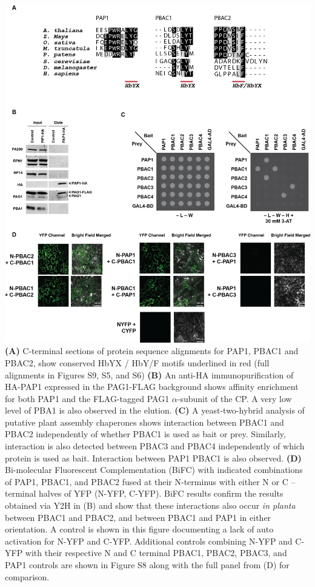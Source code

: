 \begin{FPfigure}
	\centering
	\includegraphics[width=\columnwidth]{Proteasome/papschar.png}
	{\textbf{(A)} C-terminal sections of protein sequence alignments for PAP1, PBAC1 and PBAC2, show conserved HbYX / HbY/F motifs underlined in red (full alignments in Figures S9, S5, and S6) \textbf{(B)} An anti-HA immunopurification of HA-PAP1 expressed in the PAG1-FLAG background shows affinity enrichment for both PAP1 and the FLAG-tagged PAG1 $\alpha$-subunit of the CP. A very low level of PBA1 is also observed in the elution. \textbf{(C)} A yeast-two-hybrid analysis of putative plant assembly chaperones shows interaction between PBAC1 and PBAC2 independently of whether PBAC1 is used as bait or prey. Similarly, interaction is also detected between PBAC3 and PBAC4 independently of which protein is used as bait. Interaction between PAP1 PBAC1 is also observed. \textbf{(D)} Bi-molecular Fluorescent Complementation (BiFC) with indicated combinations of PAP1, PBAC1, and PBAC2 fused at their N-terminus with either N or C –terminal halves of YFP (N-YFP, C-YFP). BiFC results confirm the results obtained via Y2H in (B) and show that these interactions also occur \textit{in planta} between PBAC1 and PBAC2, and between PBAC1 and PAP1 in either orientation. A control is shown in this figure documenting a lack of auto activation for N-YFP and C-YFP. Additional controls combining N-YFP and C-YFP with their respective N and C terminal PBAC1, PBAC2, PBAC3, and PAP1 controls are shown in Figure S8 along with the full panel from (D) for comparison.}
	\label{fig:papschar}
\end{FPfigure}

